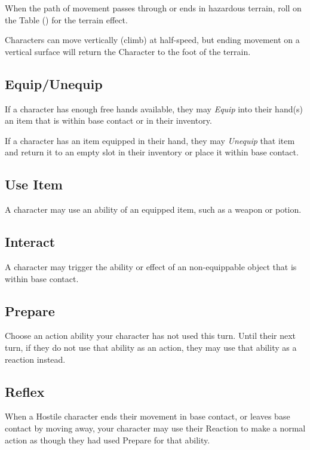 When the path of movement passes through or ends in hazardous terrain, 
roll on the Table () for the terrain effect.

\vspace{0.4em}

Characters can move vertically (climb) at half-speed, 
but ending movement on a vertical surface will return the Character 
to the foot of the terrain.


\subsection{Equip/Unequip}
If a character has enough free hands available, 
they may \textit{Equip} into their hand(s) an item that is within base contact 
or in their inventory.

\vspace{0.4em}

If a character has an item equipped in their hand, 
they may \textit{Unequip} that item and return it to an empty slot in their inventory
or place it within base contact.


\subsection{Use Item}
A character may use an ability of an equipped item, such as a weapon or potion.


\subsection{Interact}
A character may trigger the ability or effect of an non-equippable object
that is within base contact.


\subsection{Prepare}
Choose an action ability your character has not used this turn. 
Until their next turn, if they do not use that ability as an action, 
they may use that ability as a reaction instead.


\subsection{Reflex}
When a Hostile character ends their movement in base contact, 
or leaves base contact by moving away,
your character may use their Reaction to make a normal action 
as though they had used Prepare for that ability.


